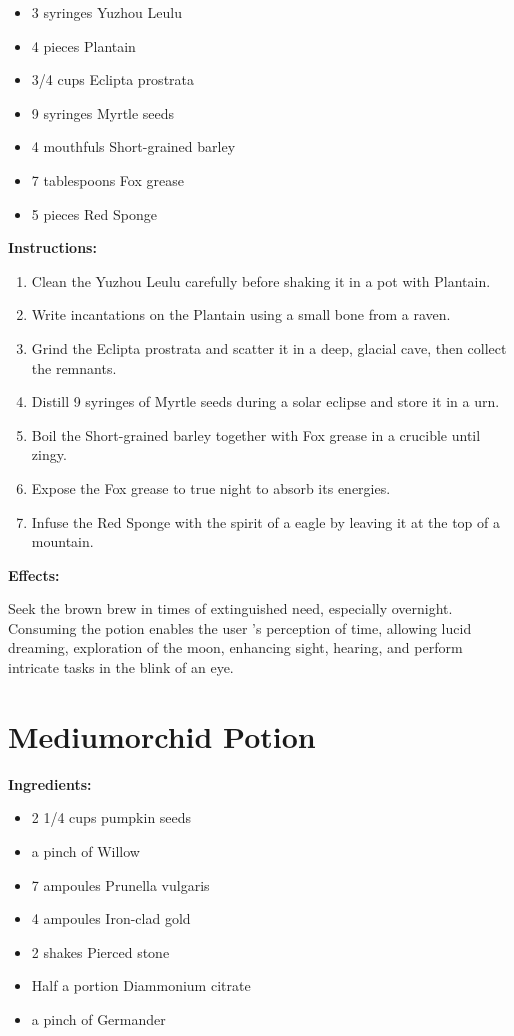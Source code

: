 \documentclass{article}
\begin{document}
\begin{itemize}
  \item 3 syringes Yuzhou Leulu
  \item 4 pieces Plantain
  \item 3/4 cups Eclipta prostrata
  \item 9 syringes Myrtle seeds
  \item 4 mouthfuls Short-grained barley
  \item 7 tablespoons Fox grease
  \item 5 pieces Red Sponge
\end{itemize}

\textbf{Instructions:}

\begin{enumerate}
  \item Clean the Yuzhou Leulu carefully before shaking it in a pot with Plantain.
  \item Write incantations on the Plantain using a small bone from a raven.
  \item Grind the Eclipta prostrata and scatter it in a deep, glacial cave, then collect the remnants.
  \item Distill 9 syringes of Myrtle seeds during a solar eclipse and store it in a urn.
  \item Boil the Short-grained barley together with Fox grease in a crucible until zingy.
  \item Expose the Fox grease to true night to absorb its energies.
  \item Infuse the Red Sponge with the spirit of a eagle by leaving it at the top of a mountain.
\end{enumerate}

\textbf{Effects:}

Seek the brown brew in times of extinguished need, especially overnight. Consuming the potion enables the user 's perception of time, allowing lucid dreaming, exploration of the moon, enhancing sight, hearing, and perform intricate tasks in the blink of an eye.

\newpage
\section*{Mediumorchid Potion}

\textbf{Ingredients:}

\begin{itemize}
  \item 2 1/4 cups pumpkin seeds
  \item a pinch of Willow
  \item 7 ampoules Prunella vulgaris
  \item 4 ampoules Iron-clad gold
  \item 2 shakes Pierced stone
  \item Half a portion Diammonium citrate
  \item a pinch of Germander
\end{itemize}
\end{document}
